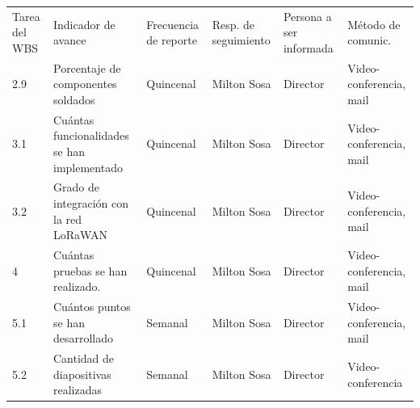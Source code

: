 \documentclass[11pt]{charter}
\begin{document}
\begin{table}[H]
	\centering
	\begin{tabularx}{\linewidth}{@{}|X|X|X|X|X|X|@{}}
		\hline
		\rowcolor[HTML]{C0C0C0} 
		\multicolumn{6}{|c|}{\cellcolor[HTML]{C0C0C0}SEGUIMIENTO DE AVANCE}                                                                       \\ \hline
		\rowcolor[HTML]{C0C0C0} 
		Tarea del WBS & Indicador de avance & Frecuencia de reporte & Resp. de seguimiento & Persona a ser informada & Método de comunic.\\ \hline
		2.9&Porcentaje de componentes soldados&Quincenal&Milton Sosa&Director&Video-conferencia, mail\\ \hline
		3.1&Cuántas funcionalidades se han implementado&Quincenal&Milton Sosa&Director&Video-conferencia, mail\\ \hline
		3.2&Grado de integración con la red LoRaWAN&Quincenal&Milton Sosa&Director&Video-conferencia, mail\\ \hline
		4&Cuántas pruebas se han realizado.&Quincenal&Milton Sosa&Director&Video-conferencia, mail\\ \hline
		5.1&Cuántos puntos se han desarrollado&Semanal&Milton Sosa&Director&Video-conferencia, mail\\ \hline
		5.2&Cantidad de diapositivas realizadas&Semanal&Milton Sosa&Director& Video-conferencia \\ \hline
	\end{tabularx}%
\end{table}
\end{document}
